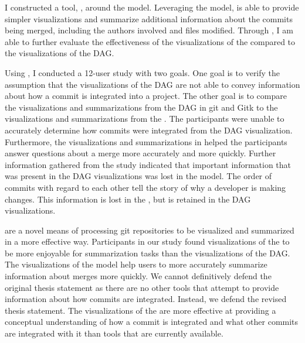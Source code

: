 I constructed a tool, \tool{}, around the \mt{} model. Leveraging the
model, \tool{} is able to provide simpler visualizations and summarize
additional information about the commits being merged, including the
authors involved and files modified. Through \tool{}, I am able to
further evaluate the effectiveness of the visualizations of the \mt{}
compared to the visualizations of the DAG\@.

Using \tool{}, I conducted a 12-user study with two goals. One goal is
to verify the assumption that the visualizations of the DAG are not able
to convey information about how a commit is integrated into a project.
The other goal is to compare the visualizations and summarizations from
the DAG in git and Gitk to the visualizations and summarizations from
the \mt{}. The participants were unable to accurately determine how
commits were integrated from the DAG visualization. Furthermore, the
visualizations and summarizations in \tool{} helped the participants
answer questions about a merge more accurately and more quickly. Further
information gathered from the study indicated that important information
that was present in the DAG visualizations was lost in the \mt{} model.
The order of commits with regard to each other tell the story of why a
developer is making changes. This information is lost in the \mt{}, but
is retained in the DAG visualizations.

 are a novel means of processing git repositories to be visualized
and summarized in a more effective way. Participants in our study found
visualizations of the \mt{} to be more enjoyable for summarization tasks
than the visualizations of the DAG\@.
The visualizations of the \mt{}
model help users to more accurately summarize information about merges
more quickly.
We cannot definitively defend the original thesis statement as there
are no other tools that attempt to provide information about how
commits are integrated.
Instead, we defend the revised thesis statement.
The visualizations of the \mt{} are more effective at providing a
conceptual understanding of how a commit is integrated and what other
commits are integrated with it than tools that are currently available.
